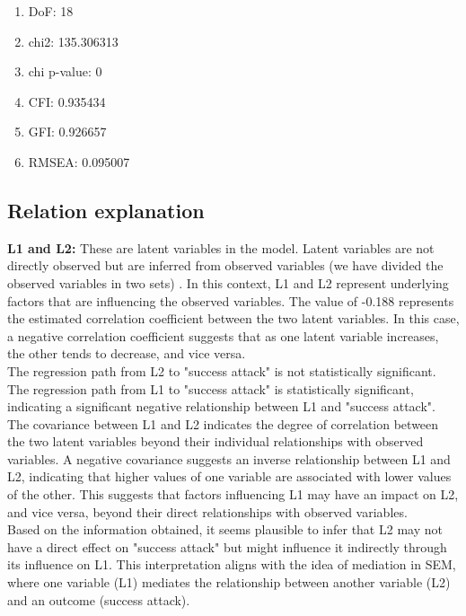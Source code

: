 \documentclass[10pt, conference, compsocconf]{IEEEtran}
\begin{document}
\begin{enumerate}
	\item DoF: 18
	\item chi2: 135.306313
	\item chi p-value: 0
	\item CFI: 0.935434
	\item GFI: 0.926657
	\item RMSEA: 0.095007
\end{enumerate}

\subsection{Relation explanation}

\textbf{L1 and L2:} These are latent variables in the model. Latent variables are not directly observed but are inferred from observed variables (we have divided the observed variables in two sets) . In this context, L1 and L2 represent underlying  factors that are influencing the observed variables. The value of -0.188 represents the estimated correlation coefficient between the two latent variables. In this case, a negative correlation coefficient suggests that as one latent variable increases, the other tends to decrease, and vice versa.\\
The regression path from L2 to "success attack" is not statistically significant.\\
The regression path from L1 to "success attack" is statistically significant, indicating a significant negative relationship between L1 and "success attack".\\

The covariance between L1 and L2 indicates the degree of correlation between the two latent variables beyond their individual relationships with observed variables. A negative covariance suggests an inverse relationship between L1 and L2, indicating that higher values of one variable are associated with lower values of the other. This suggests that factors influencing L1 may have an impact on L2, and vice versa, beyond their direct relationships with observed variables.\\

Based on the information obtained, it seems plausible to infer that L2 may not have a direct effect on "success attack" but might influence it indirectly through its influence on L1. This interpretation aligns with the idea of mediation in SEM, where one variable (L1) mediates the relationship between another variable (L2) and an outcome (success attack).\\
\end{document}
